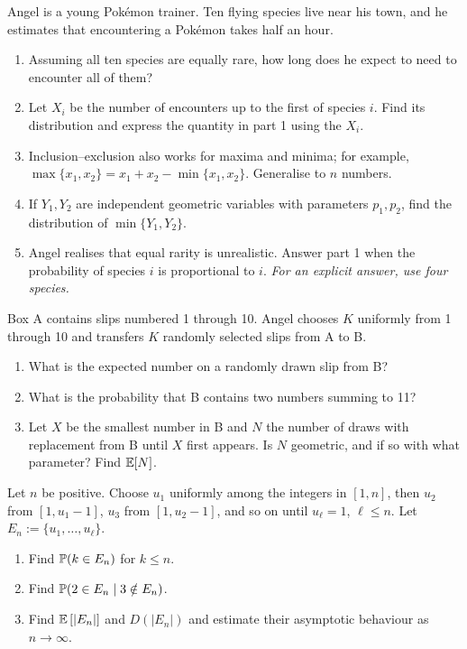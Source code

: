 \documentclass[a4paper]{report}
\begin{document}
\begin{problempencil}
Angel is a young Pok\'emon trainer. Ten flying species live near his town, and he estimates that encountering a Pok\'emon takes half an hour.
\begin{enumerate}
\item Assuming all ten species are equally rare, how long does he expect to need to encounter all of them?
\item Let $X_i$ be the number of encounters up to the first of species $i$. Find its distribution and express the quantity in part 1 using the $X_i$.
\item Inclusion--exclusion also works for maxima and minima; for example, $\max\{x_1,x_2\}=x_1+x_2-\min\{x_1,x_2\}$. Generalise to $n$ numbers.
\item If $Y_1,Y_2$ are independent geometric variables with parameters $p_1,p_2$, find the distribution of $\min\{Y_1,Y_2\}$.
\item Angel realises that equal rarity is unrealistic. Answer part 1 when the probability of species $i$ is proportional to $i$. \textit{For an explicit answer, use four species.}
\end{enumerate}
\end{problempencil}
\begin{problempencil}[E, SE 2024]
Box A contains slips numbered 1 through 10. Angel chooses $K$ uniformly from 1 through 10 and transfers $K$ randomly selected slips from A to B.
\begin{enumerate}
\item What is the expected number on a randomly drawn slip from B?
\item What is the probability that B contains two numbers summing to 11?
\item Let $X$ be the smallest number in B and $N$ the number of draws with replacement from B until $X$ first appears. Is $N$ geometric, and if so with what parameter? Find $\E[N]$.
\end{enumerate}
\end{problempencil}
\begin{problempencil}[T1, AM/Mathematics 2024]
Let $n$ be positive. Choose $u_1$ uniformly among the integers in $[1,n]$, then $u_2$ from $[1,u_1-1]$, $u_3$ from $[1,u_2-1]$, and so on until $u_\ell=1$, $\ell\le n$. Let $E_n:=\{u_1,\dots,u_\ell\}$.
\begin{enumerate}
\item Find $\P(k\in E_n)$ for $k\le n$.
\item Find $\P(2\in E_n\mid3\notin E_n)$.
\item Find $\Ebb{|E_n|}$ and $D(|E_n|)$ and estimate their asymptotic behaviour as $n\to\infty$.
\end{enumerate}
\end{problempencil}
\end{document}
